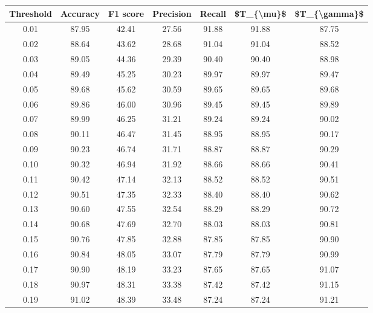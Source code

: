 \begin{tabular}{|c|c|c|c|c|c|c|}
\hline
 Threshold &  Accuracy &  F1 score &  Precision &  Recall &  \$T\_\{\textbackslash mu\}\$ &  \$T\_\{\textbackslash gamma\}\$ \\
\hline
      0.01 &     87.95 &     42.41 &      27.56 &   91.88 &      91.88 &         87.75 \\
      0.02 &     88.64 &     43.62 &      28.68 &   91.04 &      91.04 &         88.52 \\
      0.03 &     89.05 &     44.36 &      29.39 &   90.40 &      90.40 &         88.98 \\
      0.04 &     89.49 &     45.25 &      30.23 &   89.97 &      89.97 &         89.47 \\
      0.05 &     89.68 &     45.62 &      30.59 &   89.65 &      89.65 &         89.68 \\
      0.06 &     89.86 &     46.00 &      30.96 &   89.45 &      89.45 &         89.89 \\
      0.07 &     89.99 &     46.25 &      31.21 &   89.24 &      89.24 &         90.02 \\
      0.08 &     90.11 &     46.47 &      31.45 &   88.95 &      88.95 &         90.17 \\
      0.09 &     90.23 &     46.74 &      31.71 &   88.87 &      88.87 &         90.29 \\
      0.10 &     90.32 &     46.94 &      31.92 &   88.66 &      88.66 &         90.41 \\
      0.11 &     90.42 &     47.14 &      32.13 &   88.52 &      88.52 &         90.51 \\
      0.12 &     90.51 &     47.35 &      32.33 &   88.40 &      88.40 &         90.62 \\
      0.13 &     90.60 &     47.55 &      32.54 &   88.29 &      88.29 &         90.72 \\
      0.14 &     90.68 &     47.69 &      32.70 &   88.03 &      88.03 &         90.81 \\
      0.15 &     90.76 &     47.85 &      32.88 &   87.85 &      87.85 &         90.90 \\
      0.16 &     90.84 &     48.05 &      33.07 &   87.79 &      87.79 &         90.99 \\
      0.17 &     90.90 &     48.19 &      33.23 &   87.65 &      87.65 &         91.07 \\
      0.18 &     90.97 &     48.31 &      33.38 &   87.42 &      87.42 &         91.15 \\
      0.19 &     91.02 &     48.39 &      33.48 &   87.24 &      87.24 &         91.21 \\

\end{tabular}
